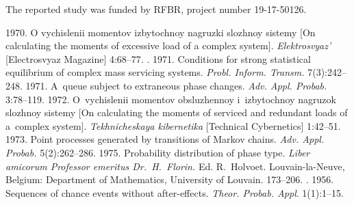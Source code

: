 {
  
  
 
  

\vspace*{-20pt}

 \Ack
 
 \vspace*{-4pt}
 
  \noindent
The reported study was funded by RFBR, project number 19-17-50126. 


 \begin{multicols}{2}

\renewcommand{\bibname}{\protect\rmfamily References}

{\small\frenchspacing
 {%
 \begin{thebibliography}{99}
 
   1970. O vychislenii momentov izbytochnoy nagruzki slozhnoy sistemy 
[On calculating the moments of excessive load of a complex system]. \textit{Elektrosvyaz'} 
[Electrosvyaz Magazine] 4:68--77.
  . 1971. 
  Conditions for strong statistical equilibrium of complex mass 
  servicing systems. \textit{Probl. Inform. Transm.} 7(3):242--248.
   1971. A~queue subject to extraneous phase changes. \textit{Adv. Appl. 
Probab.} 3:78--119.
   1972. O~vychislenii momentov obsluzhennoy i~izbytochnoy nagruzok 
slozhnoy sistemy [On calculating the moments of serviced and redundant loads of a~complex 
system]. \textit{Tekhnicheskaya kibernetika} [Technical Cybernetics] 1:42--51.
   1973. Point processes generated by transitions of Markov chains. \textit{Adv. 
Appl. Probab.} 5(2):262--286.
   1975. Probability distribution of phase type. 
  \textit{Liber amicorum 
Professor emeritus Dr.\ H.~Florin.} Ed. R.~Holvoet. 
Louvain-la-Neuve, 
Belgium: Department of Mathematics, University of Louvain. 173--206.
  . 1956.
  Sequences of chance events without after-effects.
\textit{Theor. Probab. Appl}. 1(1):1--15.


\end{thebibliography}}}
\end{multicols}}
